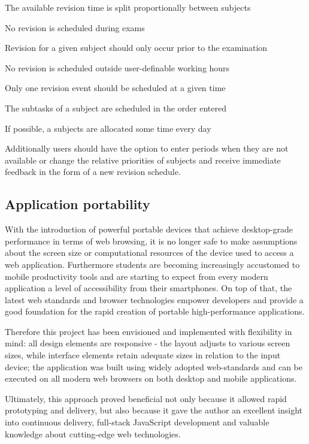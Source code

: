 \documentclass[bsc,frontabs,twoside,singlespacing,parskip]{infthesis}     %
\begin{document}
		\begin{compactitem}
		  \item The available revision time is split proportionally between subjects
		  \item No revision is scheduled during exams
		  \item Revision for a given subject should only occur prior to the examination
		  \item No revision is scheduled outside user-definable working hours
		  \item Only one revision event should be scheduled at a given time
		  \item The subtasks of a subject are scheduled in the order entered
		  \item If possible, a subjects are allocated some time every day
		\end{compactitem}

		Additionally users should have the option to enter periods when they are not available or change the relative priorities of subjects and receive immediate feedback in the form of a new revision schedule.

		\subsection{Application portability}

			With the introduction of powerful portable devices that achieve desktop-grade performance in terms of web browsing, it is no longer safe to make assumptions about the screen size or computational resources of the device used to access a web application. Furthermore students are becoming increasingly accustomed to mobile productivity tools and are starting to expect from every modern application a level of accessibility from their smartphones. On top of that, the latest web standards and browser technologies empower developers and provide a good foundation for the rapid creation of portable high-performance applications.

			Therefore this project has been envisioned and implemented with flexibility in mind: all design elements are responsive - the layout adjusts to various screen sizes, while interface elements retain adequate sizes in relation to the input device; the application was built using widely adopted web-standards and can be executed on all modern web browsers on both desktop and mobile applications.

			Ultimately, this approach proved beneficial not only because it allowed rapid prototyping and delivery, but also because it gave the author an excellent insight into continuous delivery, full-stack JavaScript development and valuable knowledge about cutting-edge web technologies.
\end{document}
